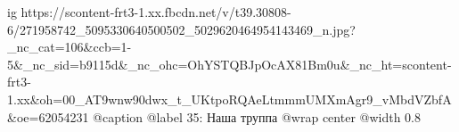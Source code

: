  
 
 
 
 

\ifcmt
  ig https://scontent-frt3-1.xx.fbcdn.net/v/t39.30808-6/271958742_5095330640500502_5029620464954143469_n.jpg?_nc_cat=106&ccb=1-5&_nc_sid=b9115d&_nc_ohc=OhYSTQBJpOcAX81Bm0u&_nc_ht=scontent-frt3-1.xx&oh=00_AT9wnw90dwx_t_UKtpoRQAeLtmmmUMXmAgr9_vMbdVZbfA&oe=62054231
  @caption @label 35: Наша труппа
  @wrap center
  @width 0.8
\fi
